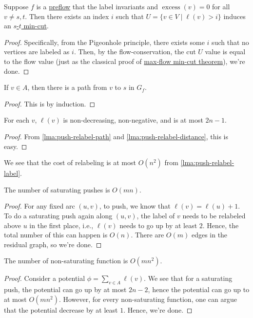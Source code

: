 \begin{lemma}\label{lma:push-relabel-cut}
	Suppose \(f\) is a \hyperref[def:preflow]{preflow} that the label invariants and \(\operatorname{excess}(v) = 0\) for all \(v \neq s, t\). Then there exists an index \(i\) such that \(U = \{ v \in V \mid \ell (v) > i \} \) induces an \hyperref[prb:s-t-min-cut]{\(s\)-\(t\) min-cut}.
\end{lemma}
\begin{proof}
	Specifically, from the Pigeonhole principle, there exists some \(i\) such that no vertices are labeled as \(i\). Then, by the flow-conservation, the cut \(U\) value is equal to the flow value (just as the classical proof of \hyperref[thm:max-flow-min-cut]{max-flow min-cut theorem}), we're done.
\end{proof}

\begin{lemma}\label{lma:push-relabel-path}
	If \(v \in A\), then there is a path from \(v\) to \(s\) in \(G_f\).
\end{lemma}
\begin{proof}
	This is by induction.
\end{proof}

\begin{lemma}\label{lma:push-relabel-label}
	For each \(v\), \(\ell (v)\)  is non-decreasing, non-negative, and is at most \(2n - 1\).
\end{lemma}
\begin{proof}
	From \autoref{lma:push-relabel-path} and \autoref{lma:push-relabel-distance}, this is easy.
\end{proof}

We see that the cost of relabeling is at most \(O(n^2)\) from \autoref{lma:push-relabel-label}.

\begin{lemma}
	The number of saturating pushes is \(O(mn)\).
\end{lemma}
\begin{proof}
	For any fixed arc \((u, v)\), to push, we know that \(\ell (v) = \ell (u) + 1\). To do a saturating push again along \((u, v)\), the label of \(v\) needs to be relabeled above \(u\) in the first place, i.e., \(\ell (v)\) needs to go up by at least \(2\). Hence, the total number of this can happen is \(O(n)\). There are \(O(m)\) edges in the residual graph, so we're done.
\end{proof}

\begin{lemma}
	The number of non-saturating function is \(O(mn^2)\).
\end{lemma}
\begin{proof}
	Consider a potential \(\phi = \sum_{v \in A} \ell (v)\). We see that for a saturating push, the potential can go up by at most \(2n - 2\), hence the potential can go up to at most \(O(mn^2)\). However, for every non-saturating function, one can argue that the potential decrease by at least \(1\). Hence, we're done.
\end{proof}

